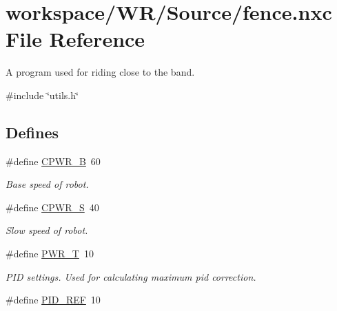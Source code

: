 \hypertarget{fence_8nxc}{
\section{workspace/WR/Source/fence.nxc File Reference}
\label{fence_8nxc}
}


A program used for riding close to the band.  


{\ttfamily \#include \char`\"{}utils.h\char`\"{}}\par
\subsection*{Defines}
\begin{DoxyCompactItemize}
\item 
\hypertarget{fence_8nxc_a738b9657b067e383cd066d4c7ca6f576}{
\#define \hyperlink{fence_8nxc_a738b9657b067e383cd066d4c7ca6f576}{CPWR\_\-B}~60}
\label{fence_8nxc_a738b9657b067e383cd066d4c7ca6f576}

\begin{DoxyCompactList}\small\item\em Base speed of robot. \item\end{DoxyCompactList}\item 
\hypertarget{fence_8nxc_ae382ea7d9a3437076c5616056836377a}{
\#define \hyperlink{fence_8nxc_ae382ea7d9a3437076c5616056836377a}{CPWR\_\-S}~40}
\label{fence_8nxc_ae382ea7d9a3437076c5616056836377a}

\begin{DoxyCompactList}\small\item\em Slow speed of robot. \item\end{DoxyCompactList}\item 
\hypertarget{fence_8nxc_a542a0090a7c37b6404cf8ba31d59f57d}{
\#define \hyperlink{fence_8nxc_a542a0090a7c37b6404cf8ba31d59f57d}{PWR\_\-T}~10}
\label{fence_8nxc_a542a0090a7c37b6404cf8ba31d59f57d}

\begin{DoxyCompactList}\small\item\em PID settings. Used for calculating maximum pid correction. \item\end{DoxyCompactList}\item 
\hypertarget{fence_8nxc_a211c307420126f39f228195cf77ae83c}{
\#define \hyperlink{fence_8nxc_a211c307420126f39f228195cf77ae83c}{PID\_\-REF}~10}
\label{fence_8nxc_a211c307420126f39f228195cf77ae83c}


\end{DoxyCompactItemize}
